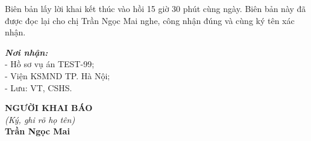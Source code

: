 \documentclass[12pt,a4paper]{article}
\begin{document}
\noindent Biên bản lấy lời khai kết thúc vào hồi 15 giờ 30 phút cùng ngày. Biên bản này đã được đọc lại cho chị Trần Ngọc Mai nghe, công nhận đúng và cùng ký tên xác nhận.

\vspace{0.8cm}

\noindent
\begin{minipage}[t]{0.45\textwidth}
    \small
    \textbf{\textit{Nơi nhận:}}\\
    - Hồ sơ vụ án TEST-99;\\
    - Viện KSMND TP. Hà Nội;\\
    - Lưu: VT, CSHS.
\end{minipage}
\hfill
\begin{minipage}[t]{0.5\textwidth}
    \begin{center}
        \small
        \textbf{NGƯỜI KHAI BÁO}\\
        \textit{(Ký, ghi rõ họ tên)}\\[1.5cm]
        \textbf{Trần Ngọc Mai}
    \end{center}
\end{minipage}
\end{document}
